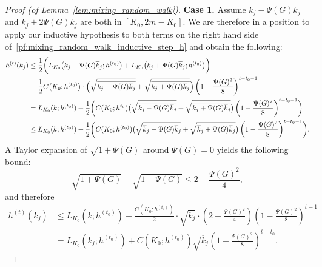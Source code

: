 \documentclass{article}
\newcommand{\1}{\mathbf{1}}
\theoremstyle{definition}
\theoremstyle{remark}
\begin{document}
\begin{proof}[Proof (of Lemma~\ref{lem:mixing_random_walk})]
	\textbf{Case 1.}
	Assume $k_j - \Psi(G) \overline{k}_j$ and $k_j + 2 \Psi(G) \overline{k}_j$ are both in $[K_0,2m  - K_0]$. We are therefore in a position to apply our inductive hypothesis to both terms on the right hand side of~\eqref{pf:mixing_random_walk_inductive_step_h} and obtain the following:
	\begin{align*}
	h^{(t)}(k_j) & \leq \frac{1}{2}\biggl(L_{K_0}\bigl(k_j - \Psi(G) \overline{k}_j; h^{(t_0)}\bigr) + L_{K_0}\bigl(k_j + \Psi(G) \overline{k}_j; h^{(t_0)}\bigr) \biggr) ~~+ \\
	& \quad~ \frac{1}{2}C\bigl(K_0; h^{(t_0)}\bigr) \cdot \Bigl(\sqrt{\overline{k_j - \Psi(G) \overline{k}_j}} + \sqrt{\overline{k_j + \Psi(G) \overline{k}_j}}\Bigr)\left(1 - \frac{\Psi(G)^2}{8}\right)^{t-t_0 - 1} \\
	& = L_{K_0}(k;h^{(t_0)}) + \frac{1}{2}\biggl(C(K_0;h^{t_0})\bigl(\sqrt{\overline{k_j - \Psi(G) \overline{k}_j}} + \sqrt{\overline{k_j + \Psi(G) \overline{k}_j}}\bigr)\left(1 - \frac{\Psi(G)^2}{8}\right)^{t-t_0 - 1} \biggr) \\
	& \leq L_{K_0}(k;h^{(t_0)}) + \frac{1}{2}\biggl(C(K_0;h^{(t_0)})\bigl(\sqrt{\overline{k}_j - \Psi(G) \overline{k}_j} + \sqrt{\overline{k}_j + \Psi(G) \overline{k}_j}\bigr)\left(1 - \frac{\Psi(G)^2}{8}\right)^{t-t_0 - 1} \biggr).
	\end{align*}
	A Taylor expansion of $\sqrt{1 + \Psi(G)}$ around $\Psi(G) = 0$ yields the following bound:
	\begin{equation*}
	\sqrt{1 + \Psi(G)} + \sqrt{1 - \Psi(G)} \leq 2 - \frac{\Psi(G)^2}{4},
	\end{equation*}
	and therefore
	\begin{align*}
	h^{(t)}(k_j) & \leq L_{K_0}(k;h^{(t_0)}) + \frac{C(K_0;h^{(t_0)})}{2}\cdot \sqrt{\overline{k}_j}\cdot\left(2 - \frac{\Psi(G)^2}{4}\right)\left(1 - \frac{\Psi(G)^2}{8}\right)^{t-1} \\
	&= L_{K_0}(k_j;h^{(t_0)}) + C(K_0;h^{(t_0)})\sqrt{\overline{k}_j}\left(1 - \frac{\Psi(G)^2}{8}\right)^{t - t_0}.
	\end{align*}
	

\end{proof}
\end{document}
